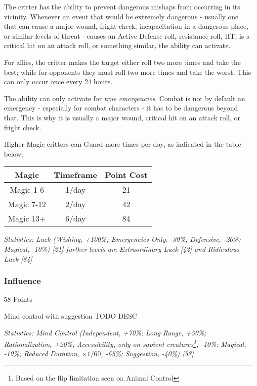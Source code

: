 \begin{multicols*}{3}
	The critter has the ability to prevent dangerous mishaps from occurring in its vicinity. Whenever an event that would be extremely dangerous - usually one that can cause a major wound, fright check, incapacitation in a dangerous place, or similar levels of threat - causes an Active Defense roll, resistance roll, HT, is a critical hit on an attack roll, or something similar, the ability can activate.
	
	For allies, the critter makes the target either roll two more times and take the best; while for opponents they must roll two more times and take the worst. This can only occur once every 24 hours.
	
	The ability can only activate for \textit{true emergencies.} Combat is not by default an emergency - especially for combat characters - it has to be dangerous beyond that. This is why it is usually a major wound, critical hit on an attack roll, or fright check.
	
	Higher Magic critters can Guard more times per day, as indicated in the table below:
	
	\begin{center}
		\begin{tabular}{|c|c|c|}
			\hline
			Magic & Timeframe & Point Cost\\
			\hline
			\hline
			Magic 1-6 & 1/day & 21 \\
			Magic 7-12 & 2/day & 42 \\
			Magic 13+ & 6/day & 84 \\
			\hline
		\end{tabular}
	\end{center}
	
	\textcolor{OliveGreen}{\textit{Statistics: Luck (Wishing, +100\%; Emergencies Only, -30\%; Defensive, -20\%; Magical, -10\%) [21] further levels are Extraordinary Luck [42] and Ridiculous Luck [84]}}
	
	
	\subsubsection{Influence}\label{influence}
	\begin{flushright}
		58 Points
	\end{flushright}
	
	Mind control with suggestion
	TODO DESC
	
	
	\textcolor{OliveGreen}{\textit{Statistics: Mind Control (Independent, +70\%; Long Range, +50\%; Rationalization, +20\%; Accessibility, only on sapient creatures\footnote{Based on the flip limitation seen on Animal Control}, -10\%; Magical, -10\%; Reduced Duration, \(\times1/60\), -65\%; Suggestion, -40\%) [58]}}
	

\end{multicols*}
